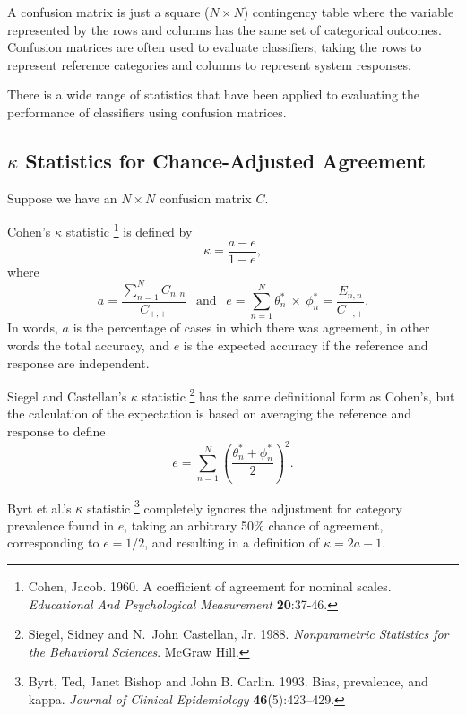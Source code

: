 A confusion matrix is just a square ($N \times N$) contingency table
where the variable represented by the rows and columns has the same
set of categorical outcomes.  Confusion matrices are often used to
evaluate classifiers, taking the rows to represent reference
categories and columns to represent system responses.

There is a wide range of statistics that have been applied to
evaluating the performance of classifiers using confusion matrices.

\subsection{$\kappa$ Statistics for Chance-Adjusted Agreement}\label{section:stats-kappa}

Suppose we have an $N \times N$ confusion matrix $C$.  

Cohen's $\kappa$ statistic%
\footnote{Cohen, Jacob. 1960. A coefficient of agreement for nominal
  scales. {\it Educational And Psychological Measurement} {\bf
    20}:37-46.}
%
is defined by
%
\begin{equation}
\kappa = \frac{a - e}{1 - e},
\end{equation}
%
where
%
\begin{equation}
a = \frac{\sum_{n=1}^N C_{n,n}}{C_{+,+}}
\ \ \mbox{ and } \ \ 
e = \sum_{n=1}^N \theta^*_n \ \times \ \phi^*_n = \frac{E_{n,n}}{C_{+,+}}.
\end{equation}
%
In words, $a$ is the percentage of cases in which there was agreement,
in other words the total accuracy, and $e$ is the expected accuracy if
the reference and response are independent.

Siegel and Castellan's $\kappa$ statistic%
\footnote{Siegel, Sidney and N.~John Castellan, Jr. 1988.  {\it
    Nonparametric Statistics for the Behavioral Sciences}. McGraw
  Hill.}
%
has the same definitional form as Cohen's, but the calculation of the
expectation is based on averaging the reference and response to define
%
\begin{equation}
e = \sum_{n=1}^N \left( \frac{\theta^*_n + \phi^*_n}{2} \right)^2.
\end{equation}

Byrt et al.'s $\kappa$ statistic%
%
\footnote{Byrt, Ted, Janet Bishop and John B. Carlin. 1993. Bias,
  prevalence, and kappa. {\it Journal of Clinical Epidemiology}
  {\bf 46}(5):423--429.}
%
completely ignores the adjustment for
category prevalence found in $e$, taking an arbitrary 50\% chance of
agreement, corresponding to $e=1/2$, and resulting in a definition of
$\kappa = 2a - 1$.



